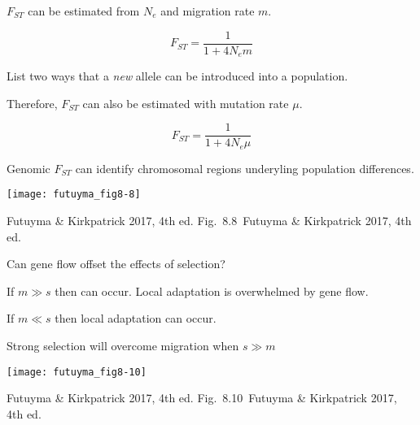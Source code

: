 \documentclass[t]{beamer}
\newcommand{\futuyma}[1]{%
	\ifthenelse{\isempty{#1}}%
	{Futuyma \& Kirkpatrick 2017, 4th ed.}%
	{Fig.~#1~Futuyma \& Kirkpatrick 2017, 4th ed.}%
}
\newcommand{\backskip}{\vspace{-0.5\baselineskip}}
\begin{document}

\begin{frame}{$F_{ST}$ can be estimated from $N_e$ and migration rate $m$.}

\begin{equation*}
F_{ST} = \dfrac{1}{1+4N_em}
\end{equation*}

\pause
\hangpara List two ways that a \emph{new} allele can be introduced into a population.

\pause
\hangpara Therefore, $F_{ST}$ can also be estimated with mutation rate $\mu$.

\begin{equation*}
F_{ST} = \dfrac{1}{1+4N_e\mu}
\end{equation*}



\end{frame}


\begin{frame}{Genomic $F_{ST}$ can identify chromosomal regions underyling population differences.}

\backskip
\centering
\texttt{[image: futuyma\_fig8-8]}

\tinyfill \futuyma{8.8}

\end{frame}


\begin{frame}{Can gene flow offset the effects of selection?}

\hangpara If $m \gg s$ then  can occur. Local adaptation is overwhelmed by gene flow.

\hangpara If $m \ll s$ then local adaptation can occur.

\end{frame}


\begin{frame}{Strong selection will overcome migration when $s \gg m$}

\backskip
\centering
\texttt{[image: futuyma\_fig8-10]}


\tinyfill \futuyma{8.10}
\end{frame}
\end{document}
